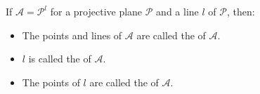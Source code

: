 If $\mathcal{A} = \mathcal{P}^l$ for a projective plane $\mathcal{P}$ and a line $l$ of $\mathcal{P}$, then:
\begin{itemize}
\item The points and lines of $\mathcal{A}$ are called the  of $\mathcal{A}$.
\item $l$ is called the  of $\mathcal{A}$.
\item The points of $l$ are called the  of $\mathcal{A}$.
\end{itemize}
